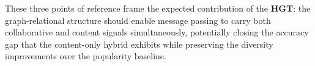 These three points of reference frame the expected contribution of the
\textbf{HGT}: the graph-relational structure should enable message passing to
carry both collaborative and content signals simultaneously, potentially closing
the accuracy gap that the content-only hybrid exhibits while preserving the
diversity improvements over the popularity baseline. 
